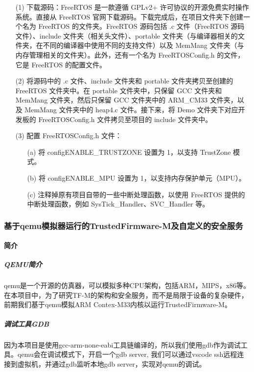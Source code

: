 \documentclass[12pt,a4paper]{ctexart}
\numberwithin{figure}{section}
\begin{document}
\begin{itemize}
    \item[(1)] 下载源码：FreeRTOS 是一款遵循 GPLv2+ 许可协议的开源免费实时操作系统。直接从 FreeRTOS 官网下载源码。下载完成后，在项目文件夹下创建一个名为 FreeRTOS 的文件夹。FreeRTOS 源码包括 .c 文件（FreeRTOS 源码文件）、include 文件夹（相关头文件）、portable 文件夹（与编译器相关的文件夹，在不同的编译器中使用不同的支持文件）以及 MemMang 文件夹（与内存管理相关的文件夹）。此外，还有一个名为 FreeRTOSConfig.h 的文件，它是 FreeRTOS 的配置文件。

    \item[(2)] 将源码中的 .c 文件、include 文件夹和 portable 文件夹拷贝至创建的 FreeRTOS 文件夹中。在 portable 文件夹中，只保留 GCC 文件夹和 MemMang 文件夹，然后只保留 GCC 文件夹中的 ARM\_CM33 文件夹，以及 MemMang 文件夹中的 heap4.c 文件。接下来，将 Demo 文件夹下对应开发板的 FreeRTOSConfig.h 文件拷贝至项目的 include 文件夹中。

    \item[(3)] 配置 FreeRTOSConfig.h 文件：
        \begin{itemize}
            \item[(a)] 将 configENABLE\_TRUSTZONE 设置为 1，以支持 TrustZone 模式。
            \item[(b)] 将 configENABLE\_MPU 设置为 1，以支持内存保护单元（MPU）。
            \item[(c)] 注释掉原有项目自带的一些中断处理函数，以使用 FreeRTOS 提供的中断处理函数，例如 SysTick\_Handler、SVC\_Handler 等。
        \end{itemize}
\end{itemize}
\subsubsection{基于qemu模拟器运行的TrustedFirmware-M及自定义的安全服务}
\paragraph{简介}
\subparagraph{QEMU简介}
\par qemu是一个开源的仿真器，可以模拟多种CPU架构，包括ARM，MIPS，x86等。在本项目中，为了研究TF-M的架构和安全服务，而不是局限于设备的复杂硬件，前期我们基于qemu模拟ARM Contex-M33内核以运行TrustedFirmware-M。
\subparagraph{调试工具GDB}
因为本项目是使用gcc-arm-none-eabi工具链编译的，所以我们使用gdb作为调试工具。qemu会在调试模式下，开启一个gdb server, 我们可以通过vscode ssh远程连接到虚拟机，并通过gdb监听本地gdb server，实现对qemu的调试。
\end{document}
